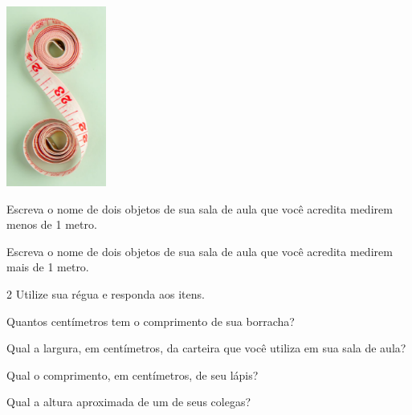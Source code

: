 \includegraphics[width=1.29167in,height=2.33463in]{media/image41.png}


\begin{escolha}
\item Escreva o nome de dois objetos de sua sala de aula que você acredita
  medirem menos de 1 metro.


\item Escreva o nome de dois objetos de sua sala de aula que você acredita
  medirem mais de 1 metro.

\end{escolha}

\num{2} Utilize sua régua e responda aos itens.

\begin{escolha}
\item Quantos centímetros tem o comprimento de sua borracha?


\item Qual a largura, em centímetros, da carteira que você utiliza em sua sala de aula?


\item Qual o comprimento, em centímetros, de seu lápis?


\item Qual a altura aproximada de um de seus colegas?

\end{escolha}

